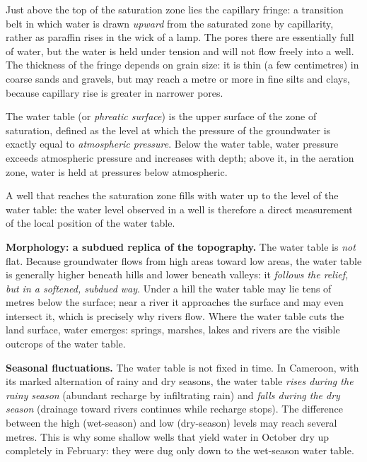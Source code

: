 \documentclass[11pt]{article}
\newcommand{\cle}[1]{{\popxbold\color{popdark}#1}}
\newcounter{popsec}
\newcounter{popsub}
\newcommand{\courssub}[1]{%
  \stepcounter{popsub}%
  \par\vspace{9pt}\noindent{\popxbold\fontsize{11.5}{13}\selectfont\color{popink}{\color{poporange}\thepopsec.\thepopsub}\hspace{6pt}#1}\par\nopagebreak\vspace{4pt}
}
\begin{document}
Just above the top of the saturation zone lies the \cle{capillary fringe}: a transition belt in which water is drawn \emph{upward} from the saturated zone by capillarity, rather as paraffin rises in the wick of a lamp. The pores there are essentially full of water, but the water is held under tension and will not flow freely into a well. The thickness of the fringe depends on grain size: it is thin (a few centimetres) in coarse sands and gravels, but may reach a metre or more in fine silts and clays, because capillary rise is greater in narrower pores.

\courssub{The Water Table}

\begin{definition}
The \cle{water table} (or \emph{phreatic surface}) is the upper surface of the zone of saturation, defined as the level at which the pressure of the groundwater is exactly equal to \emph{atmospheric pressure}. Below the water table, water pressure exceeds atmospheric pressure and increases with depth; above it, in the aeration zone, water is held at pressures below atmospheric.
\end{definition}

A well that reaches the saturation zone fills with water up to the level of the water table: the water level observed in a well is therefore a direct measurement of the local position of the water table.

\textbf{Morphology: a subdued replica of the topography.} The water table is \emph{not} flat. Because groundwater flows from high areas toward low areas, the water table is generally higher beneath hills and lower beneath valleys: it \emph{follows the relief, but in a softened, subdued way}. Under a hill the water table may lie tens of metres below the surface; near a river it approaches the surface and may even intersect it, which is precisely why rivers flow. Where the water table cuts the land surface, water emerges: springs, marshes, lakes and rivers are the visible outcrops of the water table.

\textbf{Seasonal fluctuations.} The water table is not fixed in time. In Cameroon, with its marked alternation of rainy and dry seasons, the water table \emph{rises during the rainy season} (abundant recharge by infiltrating rain) and \emph{falls during the dry season} (drainage toward rivers continues while recharge stops). The difference between the high (wet-season) and low (dry-season) levels may reach several metres. This is why some shallow wells that yield water in October dry up completely in February: they were dug only down to the wet-season water table.
\end{document}
